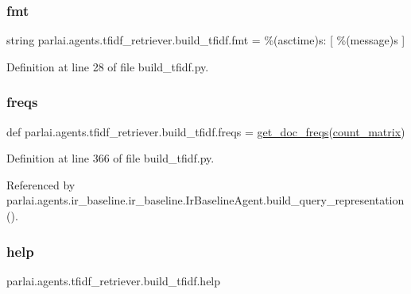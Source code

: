 \subsubsection{\texorpdfstring{fmt}{fmt}}
{\footnotesize\ttfamily string parlai.\+agents.\+tfidf\+\_\+retriever.\+build\+\_\+tfidf.\+fmt = \textquotesingle{}\%(asctime)s\+: \mbox{[} \%(message)s \mbox{]}\textquotesingle{}}



Definition at line 28 of file build\+\_\+tfidf.\+py.

\mbox{\label{namespaceparlai_1_1agents_1_1tfidf__retriever_1_1build__tfidf_abb3607652abdd76d57a6ae90e19e3828}} 
\subsubsection{\texorpdfstring{freqs}{freqs}}
{\footnotesize\ttfamily def parlai.\+agents.\+tfidf\+\_\+retriever.\+build\+\_\+tfidf.\+freqs = \hyperlink{namespaceparlai_1_1agents_1_1tfidf__retriever_1_1build__tfidf_ac6883ed21006848661f6c748f91aff56}{get\+\_\+doc\+\_\+freqs}(\hyperlink{namespaceparlai_1_1agents_1_1tfidf__retriever_1_1build__tfidf_afe20f2925824bab82a89672734347544}{count\+\_\+matrix})}



Definition at line 366 of file build\+\_\+tfidf.\+py.



Referenced by parlai.\+agents.\+ir\+\_\+baseline.\+ir\+\_\+baseline.\+Ir\+Baseline\+Agent.\+build\+\_\+query\+\_\+representation().

\mbox{\label{namespaceparlai_1_1agents_1_1tfidf__retriever_1_1build__tfidf_a0e12682c80997535ca4f7f293b8c6d10}} 
\subsubsection{\texorpdfstring{help}{help}}
{\footnotesize\ttfamily parlai.\+agents.\+tfidf\+\_\+retriever.\+build\+\_\+tfidf.\+help}



